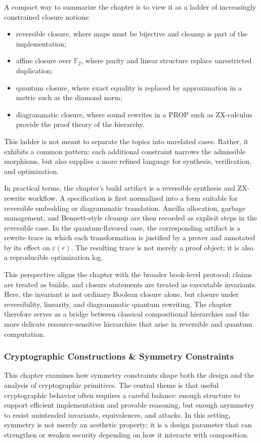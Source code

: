 \documentclass[11pt]{article}
\begin{document}
A compact way to summarize the chapter is to view it as a ladder of increasingly constrained closure notions:
\begin{itemize}
  \item reversible closure, where maps must be bijective and cleanup is part of the implementation;
  \item affine closure over \(\mathbb{F}_2\), where parity and linear structure replace unrestricted duplication;
  \item quantum closure, where exact equality is replaced by approximation in a metric such as the diamond norm;
  \item diagrammatic closure, where sound rewrites in a PROP such as ZX-calculus provide the proof theory of the hierarchy.
\end{itemize}
This ladder is not meant to separate the topics into unrelated cases. Rather, it exhibits a common pattern: each additional constraint narrows the admissible morphisms, but also supplies a more refined language for synthesis, verification, and optimization.

In practical terms, the chapter’s build artifact is a reversible synthesis and ZX-rewrite workflow. A specification is first normalized into a form suitable for reversible embedding or diagrammatic translation. Ancilla allocation, garbage management, and Bennett-style cleanup are then recorded as explicit steps in the reversible case. In the quantum-flavored case, the corresponding artifact is a rewrite trace in which each transformation is justified by a prover and annotated by its effect on \(\varepsilon(r)\). The resulting trace is not merely a proof object; it is also a reproducible optimization log.

This perspective aligns the chapter with the broader book-level protocol: claims are treated as builds, and closure statements are treated as executable invariants. Here, the invariant is not ordinary Boolean closure alone, but closure under reversibility, linearity, and diagrammatic quantum rewriting. The chapter therefore serves as a bridge between classical compositional hierarchies and the more delicate resource-sensitive hierarchies that arise in reversible and quantum computation.


\subsubsection{Cryptographic Constructions \& Symmetry Constraints}

This chapter examines how symmetry constraints shape both the design and the analysis of cryptographic primitives. The central theme is that useful cryptographic behavior often requires a careful balance: enough structure to support efficient implementation and provable reasoning, but enough asymmetry to resist unintended invariants, equivalences, and attacks. In this setting, symmetry is not merely an aesthetic property; it is a design parameter that can strengthen or weaken security depending on how it interacts with composition.
\end{document}
